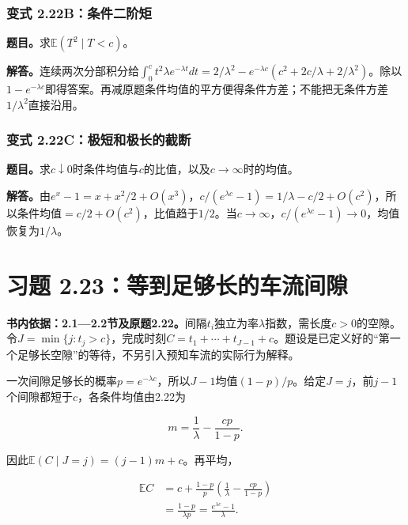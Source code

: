 \documentclass[12pt,a4paper,UTF8,fontset=fandol]{ctexart}
\begin{document}
\subsubsection{变式
2.22B：条件二阶矩}\label{ux53d8ux5f0f-2.22bux6761ux4ef6ux4e8cux9636ux77e9}

\textbf{题目。}求\(\mathbb E(T^2\mid T<c)\)。

\textbf{解答。}连续两次分部积分给\(\int_0^c t^2\lambda e^{-\lambda t}dt=2/\lambda^2-e^{-\lambda c}(c^2+2c/\lambda+2/\lambda^2)\)。除以\(1-e^{-\lambda c}\)即得答案。再减原题条件均值的平方便得条件方差；不能把无条件方差\(1/\lambda^2\)直接沿用。

\subsubsection{变式
2.22C：极短和极长的截断}\label{ux53d8ux5f0f-2.22cux6781ux77edux548cux6781ux957fux7684ux622aux65ad}

\textbf{题目。}求\(c\downarrow0\)时条件均值与\(c\)的比值，以及\(c\to\infty\)时的均值。

\textbf{解答。}由\(e^x-1=x+x^2/2+O(x^3)\)，\(c/(e^{\lambda c}-1)=1/\lambda-c/2+O(c^2)\)，所以条件均值\(=c/2+O(c^2)\)，比值趋于\(1/2\)。当\(c\to\infty\)，\(c/(e^{\lambda c}-1)\to0\)，均值恢复为\(1/\lambda\)。

\section{习题
2.23：等到足够长的车流间隙}\label{ux4e60ux9898-2.23ux7b49ux5230ux8db3ux591fux957fux7684ux8f66ux6d41ux95f4ux9699}

\textbf{书内依据：2.1---2.2节及原题2.22。}间隔\(t_i\)独立为率\(\lambda\)指数，需长度\(c>0\)的空隙。令\(J=\min\{j:t_j>c\}\)，完成时刻\(C=t_1+\cdots+t_{J-1}+c\)。题设是已定义好的``第一个足够长空隙''的等待，不另引入预知车流的实际行为解释。

一次间隙足够长的概率\(p=e^{-\lambda c}\)，所以\(J-1\)均值\((1-p)/p\)。给定\(J=j\)，前\(j-1\)个间隙都短于\(c\)，各条件均值由2.22为

\[m=\frac1\lambda-\frac{cp}{1-p}.\]

因此\(\mathbb E(C\mid J=j)=(j-1)m+c\)。再平均，

\[
\begin{aligned}
\mathbb EC
&=c+\frac{1-p}{p}\left(\frac1\lambda-\frac{cp}{1-p}\right)\\
&=\frac{1-p}{\lambda p}
=\boxed{\frac{e^{\lambda c}-1}{\lambda}}.
\end{aligned}
\]
\end{document}
